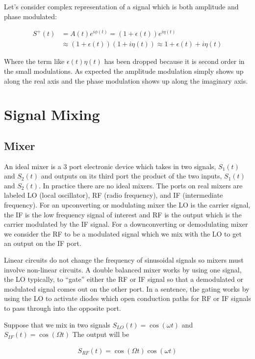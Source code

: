 \documentclass[12pt]{article}
\begin{document}
Let's consider complex representation of a signal which is both amplitude and phase modulated:

\begin{align}
S^+(t) &= A(t)e^{i\phi(t)} = (1+\epsilon(t))e^{i\eta(t)}\\
&\approx (1+\epsilon(t))(1+i\eta(t)) \approx 1 + \epsilon(t) + i\eta(t)
\end{align}

Where the term like $\epsilon(t)\eta(t)$ has been dropped because it is second order in the small modulations. As expected the amplitude modulation simply shows up along the real axis and the phase modulation shows up along the imaginary axis.

\section{Signal Mixing}
\subsection{Mixer}
An ideal mixer is a 3 port electronic device which takes in two signals, $S_1(t)$ and $S_2(t)$ and outputs on its third port the product of the two inputs, $S_1(t)$ and $S_2(t)$. In practice there are no ideal mixers. The ports on real mixers are labeled LO (local oscillator), RF (radio frequency), and IF (intermediate frequency). For an upconverting or modulating mixer the LO is the carrier signal, the IF is the low frequency signal of interest and RF is the output which is the carrier modulated by the IF signal. For a downconverting or demodulating mixer we consider the RF to be a modulated signal which we mix with the LO to get an output on the IF port. 

Linear circuits do not change the frequency of sinusoidal signals so mixers must involve non-linear circuits. A double balanced mixer works by using one signal, the LO typically, to ``gate'' either the RF or IF signal so that a demodulated or modulated signal comes out on the other port. In a sentence, the gating works by using the LO to activate diodes which open conduction paths for RF or IF signals to pass through into the opposite port. 

Suppose that we mix in two signals $S_{LO}(t) = \cos(\omega t)$ and $S_{IF}(t) = \cos(\Omega t)$ The output will be

\begin{align}
S_{RF}(t) = \cos(\Omega t)\cos(\omega t)
\end{align}
\end{document}
